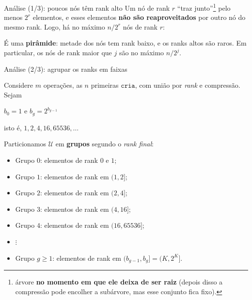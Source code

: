 \documentclass[aspectratio=169,10pt]{beamer}
\newcommand{\Cria}{\mathtt{cria}}
\begin{document}
\begin{frame}[c]{Análise (1/3): poucos nós têm rank alto}
  Um nó de rank $r$ ``traz junto''\footnote{árvore \textbf{no momento em que ele deixa de ser raiz} (depois disso a
compressão pode encolher a subárvore, mas esse conjunto fica fixo).} pelo menos $2^r$ elementos, e
  esses elementos \textbf{não são reaproveitados} por outro nó do mesmo
  rank.  Logo, há no máximo $n/2^r$ nós de rank $r$:

  \medskip
  \centering

  \medskip
  \raggedright
  É uma \textbf{pirâmide}: metade dos nós tem rank baixo, e os ranks altos
  são raros.  Em particular, os nós de rank maior que $j$ são no máximo
  $n/2^j$.
\end{frame}
\begin{frame}[c]{Análise (2/3): agrupar os ranks em faixas}

  Considere $m$ operações, as $n$ primeiras $\Cria$, com união por
  \textit{rank} e compressão.  Sejam
  \begin{center}
    $b_0=1$ e $b_g=2^{b_{g-1}}$
  \end{center}
  isto é, $1,2,4,16,65536,\dots$

  \bigskip
  
  Particionamos $\mathcal U$ em \textbf{grupos} segundo o \textit{rank
    final}:
  \begin{itemize}
  \item Grupo $0$: elementos de rank $0$ e $1$;
  \item Grupo $1$: elementos de rank em $(1,2]$;
  \item Grupo $2$: elementos de rank em $(2,4]$;
  \item Grupo $3$: elementos de rank em $(4, 16]$;
  \item Grupo $4$: elementos de rank em $(16, 65536]$;
  \item $\vdots$
  \item Grupo $g\geq1$: elementos de rank em $(b_{g-1},b_g]=(K,2^K]$.
  \end{itemize}
 \end{frame}
\end{document}
